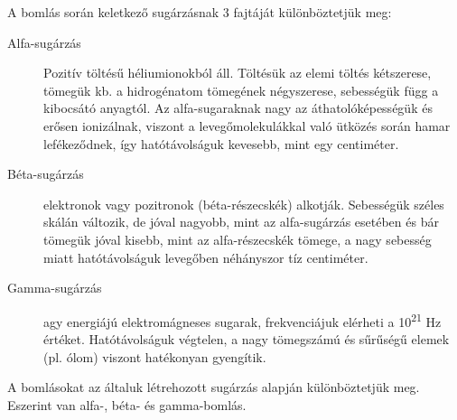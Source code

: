 A bomlás során keletkező sugárzásnak 3 fajtáját különböztetjük meg:
\begin{description}
	\item[Alfa-sugárzás] Pozitív töltésű héliumionokból áll. Töltésük az elemi töltés kétszerese, tömegük kb. a hidrogénatom tömegének négyszerese, sebességük függ a kibocsátó anyagtól. Az alfa-sugaraknak nagy az áthatolóképességük és erősen ionizálnak, viszont a levegőmolekulákkal való ütközés során hamar lefékeződnek, így hatótávolságuk kevesebb, mint egy centiméter.
	\item[Béta-sugárzás] elektronok vagy pozitronok (béta-részecskék) alkotják. Sebességük széles skálán változik, de jóval nagyobb, mint az alfa-sugárzás esetében és bár tömegük jóval kisebb, mint az alfa-részecskék tömege, a nagy sebesség miatt hatótávolságuk levegőben néhányszor tíz centiméter.
	\item[Gamma-sugárzás] agy energiájú elektromágneses sugarak, frekvenciájuk elérheti a 10\textsuperscript{21} Hz értéket. Hatótávolságuk végtelen, a nagy tömegszámú és sűrűségű elemek (pl. ólom) viszont hatékonyan gyengítik.
\end{description}
A bomlásokat az általuk létrehozott sugárzás alapján különböztetjük meg. Eszerint van alfa-, béta- és gamma-bomlás.